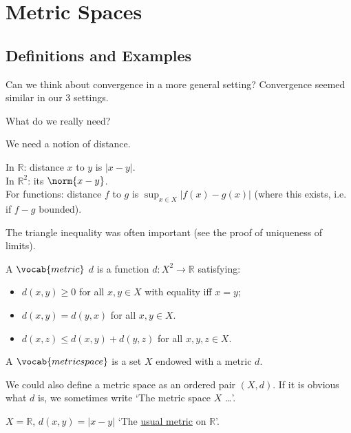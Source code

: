 \section{Metric Spaces}
\subsection{Definitions and Examples}

\begin{question}
    Can we think about convergence in a more general setting? Convergence seemed similar in our 3 settings.

    What do we really need?
\end{question} 
\begin{answer}
    We need a notion of distance.

    In $\mathbb{R}$: distance $x$ to $y$ is $|x-y|$. \\
    In $\mathbb{R}^2$: its $\norm{x - y}$. \\
    For functions: distance $f$ to $g$ is $\sup_{x \in X} |f(x) - g(x)|$ (where this exists, i.e. if $f - g$ bounded).

    The triangle inequality was often important (see the proof of uniqueness of limits).
\end{answer}

\begin{definition}[Metric]
    A $\vocab{metric}$ $d$ is a function $d : X^2 \to \mathbb{R}$ satisfying:
    \begin{itemize}
        \item $d(x, y) \geq 0$ for all $x, y \in X$ with equality iff $x = y$;
        \item $d(x, y) = d(y, x)$ for all $x, y \in X$.
        \item $d(x, z) \leq d(x, y) + d(y, z)$ for all $x, y, z \in X$.
    \end{itemize} 
\end{definition} 

\begin{definition}
    A $\vocab{metric space}$ is a set $X$ endowed with a metric $d$.
\end{definition} 
We could also define a metric space as an ordered pair $(X, d)$.
If it is obvious what $d$ is, we sometimes write `The metric space $X$ \dots'.

\begin{example}
    $X = \mathbb{R}$, $d(x, y) = |x - y|$
    `The \underline{usual metric} on $\mathbb{R}$'.
\end{example} 

